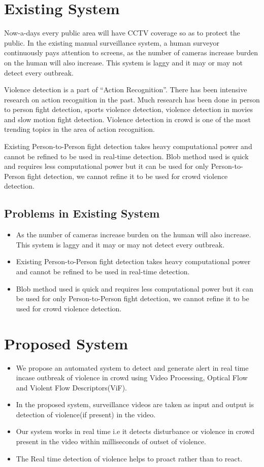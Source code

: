 \section{Existing System}
Now-a-days every public area will have CCTV coverage so as to protect the public. In the existing manual surveillance system, a human surveyor continuously pays attention to screens, as the number of cameras increase burden on the human will also increase. This system is laggy and it may or may not detect every  outbreak. 
\par
Violence detection is a part of “Action Recognition”. There has been intensive research on action recognition in the past. Much research has been done in person to person fight detection, sports violence detection, violence detection in movies and slow motion fight detection. Violence detection in crowd is one of the most trending topics in the area of action recognition. 
\par
Existing Person-to-Person fight detection takes heavy computational power and cannot be refined to be used in real-time detection. Blob method used is quick and requires less computational power but it can be used for only Person-to-Person fight detection, we cannot refine it to be used for crowd violence detection.
\subsection{Problems in Existing System}
\begin{itemize}
	\item As the number of cameras increase burden on the human will also increase. This system is laggy and it may or may not detect every  outbreak.
	\item Existing Person-to-Person fight detection takes heavy computational power and cannot be refined to be used in real-time detection.
	\item Blob method used is quick and requires less computational power but it can be used for only Person-to-Person fight detection, we cannot refine it to be used for crowd violence detection.
\end{itemize}
\section{Proposed System}
\begin{itemize}
  \item We propose an automated system to detect and generate alert in real time incase outbreak of violence in crowd using Video Processing, Optical Flow and Violent Flow Descriptors(ViF). 
  \item In the proposed system, surveillance videos are taken as input and output is detection of violence(if present) in the video.
  \item Our system works in real time i.e it detects disturbance or violence in crowd present in the video within milliseconds of outset of violence. 
  \item The Real time detection of violence helps to proact rather than to react.
\end{itemize}
